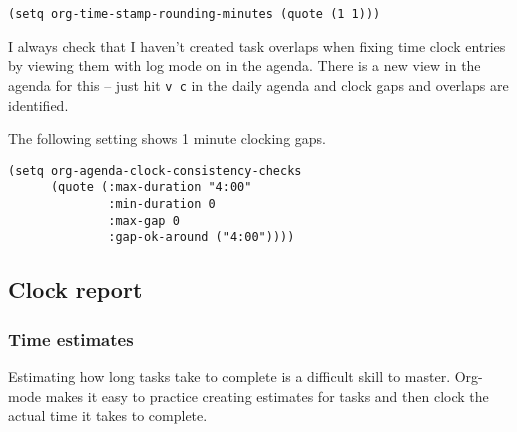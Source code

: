 \documentclass[11pt]{scrartcl}
\begin{document}
\begin{verbatim}
(setq org-time-stamp-rounding-minutes (quote (1 1)))
\end{verbatim}

I always check that I haven't created task overlaps when fixing time
clock entries by viewing them with log mode on in the agenda.  There
is a new view in the agenda for this -- just hit \texttt{v c} in the daily
agenda and clock gaps and overlaps are identified.

The following setting shows 1 minute clocking gaps.
\begin{verbatim}
(setq org-agenda-clock-consistency-checks
      (quote (:max-duration "4:00"
              :min-duration 0
              :max-gap 0
              :gap-ok-around ("4:00"))))
\end{verbatim}
\subsection{Clock report}
\label{sec:orgheadline29}
\subsubsection{Time estimates}
\label{sec:orgheadline27}
Estimating how long tasks take to complete is a difficult skill to
master.  Org-mode makes it easy to practice creating estimates for
tasks and then clock the actual time it takes to complete.
\end{document}
